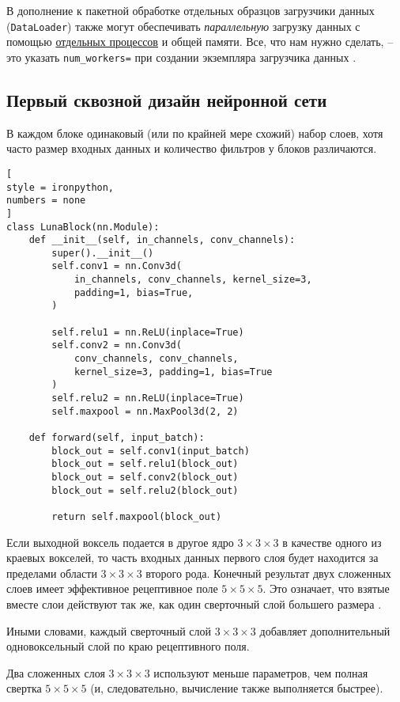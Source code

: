 \documentclass[%
	11pt,
	a4paper,
	utf8,
		]{article}
\begin{document}
В дополнение к пакетной обработке отдельных образцов загрузчики данных (\verb|DataLoader|) также могут обеспечивать \emph{параллельную} загрузку данных с помощью \underline{отдельных процессов} и общей памяти. Все, что нам нужно сделать, -- это указать \verb|num_workers=| при создании экземпляра загрузчика данных \cite[]{pytorch-2022}.

\subsection{Первый сквозной дизайн нейронной сети}

В каждом блоке одинаковый (или по крайней мере схожий) набор слоев, хотя часто размер входных данных и количество фильтров у блоков различаются.

\begin{lstlisting}[
style = ironpython,
numbers = none
]
class LunaBlock(nn.Module):
    def __init__(self, in_channels, conv_channels):
        super().__init__()
        self.conv1 = nn.Conv3d(
            in_channels, conv_channels, kernel_size=3, 
            padding=1, bias=True,
        )
        
        self.relu1 = nn.ReLU(inplace=True)
        self.conv2 = nn.Conv3d(
            conv_channels, conv_channels,
            kernel_size=3, padding=1, bias=True
        )
        self.relu2 = nn.ReLU(inplace=True)
        self.maxpool = nn.MaxPool3d(2, 2)
        
    def forward(self, input_batch):
        block_out = self.conv1(input_batch)
        block_out = self.relu1(block_out)
        block_out = self.conv2(block_out)
        block_out = self.relu2(block_out)
        
        return self.maxpool(block_out)
\end{lstlisting}

Если выходной воксель подается в другое ядро $3 \times 3 \times 3$ в качестве одного из краевых вокселей, то часть входных данных первого слоя будет находится за пределами области $3 \times 3 \times 3$ второго рода. Конечный результат двух сложенных слоев имеет эффективное рецептивное поле $5 \times 5 \times 5$. Это означает, что взятые вместе слои действуют так же, как один сверточный слой большего размера \cite[]{pytorch-2022}.

Иными словами, каждый сверточный слой $3 \times 3 \times 3$ добавляет дополнительный одновоксельный слой по краю рецептивного поля. 

Два сложенных слоя $3 \times 3 \times 3$ используют меньше параметров, чем полная свертка $5 \times 5 \times 5$ (и, следовательно, вычисление также выполняется быстрее).
\end{document}

